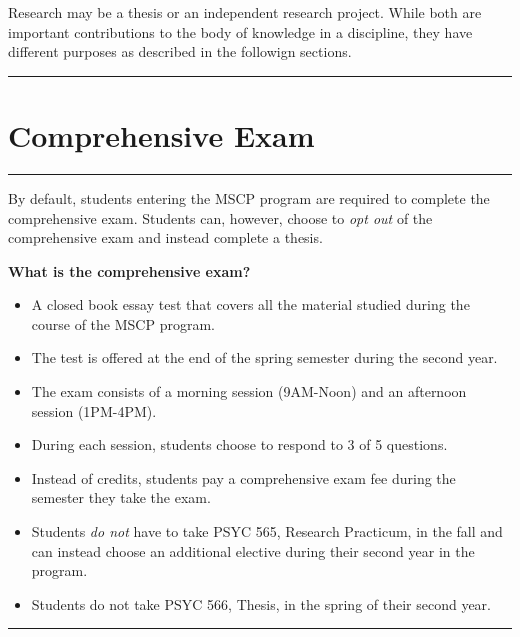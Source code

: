 \documentclass[openany]{book}
\providecommand{\tightlist}{%
  \setlength{\itemsep}{0pt}\setlength{\parskip}{0pt}}
\begin{document}
Research may be a thesis or an independent research project. While both are important contributions to the body of knowledge in a discipline, they have different purposes as described in the followign sections.

\begin{center}\rule{0.5\linewidth}{0.5pt}\end{center}

\hypertarget{comprehensive-exam}{%
\section{Comprehensive Exam}\label{comprehensive-exam}}

\begin{center}\rule{0.5\linewidth}{0.5pt}\end{center}

By default, students entering the MSCP program are required to complete the comprehensive exam. Students can, however, choose to \emph{opt out} of the comprehensive exam and instead complete a thesis.

\textbf{What is the comprehensive exam?}

\begin{itemize}
\tightlist
\item
  A closed book essay test that covers all the material studied during the course
  of the MSCP program.\\
\item
  The test is offered at the end of the spring semester during the second year.
\item
  The exam consists of a morning session (9AM-Noon) and an afternoon session (1PM-4PM).
\item
  During each session, students choose to respond to 3 of 5 questions.
\item
  Instead of credits, students pay a comprehensive exam fee during the semester they
  take the exam.
\item
  Students \emph{do not} have to take PSYC 565, Research Practicum, in the fall and can instead choose an
  additional elective during their second year in the program.
\item
  Students do not take PSYC 566, Thesis, in the spring of their second year.
\end{itemize}

\begin{center}\rule{0.5\linewidth}{0.5pt}\end{center}
\end{document}
